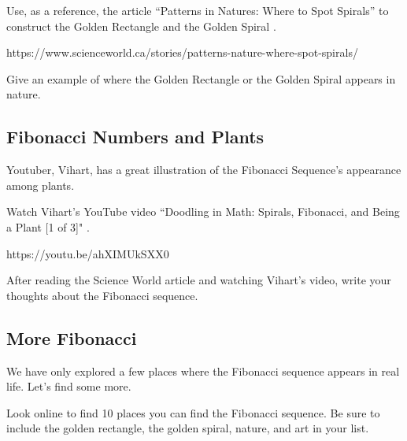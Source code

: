 \newpage 

\begin{exercise}
Use, as a reference, the article “Patterns in Natures: Where to Spot Spirals” to construct the Golden Rectangle and the Golden Spiral \cite{fibonacci}.
\end{exercise}
\footnotesize{https://www.scienceworld.ca/stories/patterns-nature-where-spot-spirals/}

\vspace{3in}

\begin{exercise}
Give an example of where the Golden Rectangle or the Golden Spiral appears in nature.
\end{exercise}

\blanks

\subsection{Fibonacci Numbers and Plants}

Youtuber, Vihart, has a great illustration of the Fibonacci Sequence's appearance among plants. 

\begin{exercise}
Watch Vihart's YouTube video ``Doodling in Math: Spirals, Fibonacci, and Being a Plant [1 of 3]" \cite{vihart}.
\end{exercise}
\footnotesize{https://youtu.be/ahXIMUkSXX0}

\begin{exercise}
After reading the Science World article and watching Vihart's video, write your thoughts about the Fibonacci sequence.
\end{exercise}

\blanks
\blanks

\subsection{More Fibonacci}

We have only explored a few places where the Fibonacci sequence appears in real life. Let's find some more.

\begin{exercise}\label{onlinefibonacci}
Look online to find 10 places you can find the Fibonacci sequence. Be sure to include the golden rectangle, the golden spiral, nature, and art in your list.
\end{exercise}


